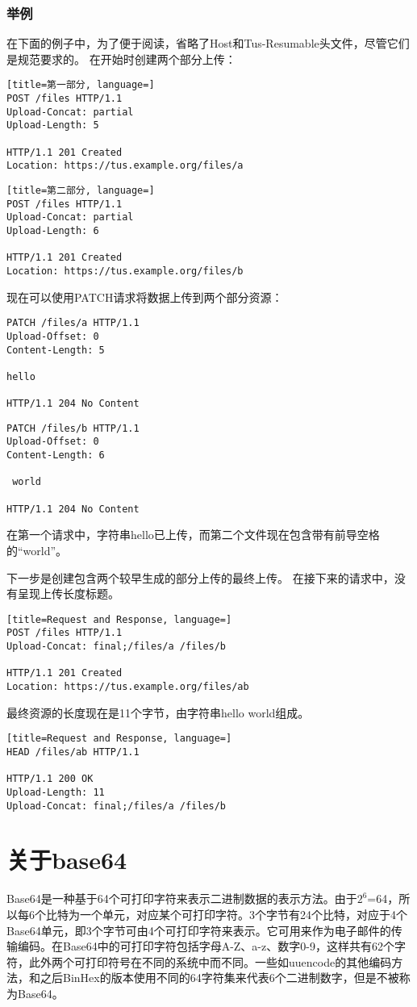 \documentclass[bachelor]{thesis-uestc}
\begin{document}
\subsubsection{举例}
在下面的例子中，为了便于阅读，省略了Host和Tus-Resumable头文件，尽管它们是规范要求的。 在开始时创建两个部分上传：
\begin{lstlisting}[title=第一部分, language=]
POST /files HTTP/1.1
Upload-Concat: partial
Upload-Length: 5

HTTP/1.1 201 Created
Location: https://tus.example.org/files/a
\end{lstlisting}
\begin{lstlisting}[title=第二部分, language=]
POST /files HTTP/1.1
Upload-Concat: partial
Upload-Length: 6

HTTP/1.1 201 Created
Location: https://tus.example.org/files/b
\end{lstlisting}
现在可以使用PATCH请求将数据上传到两个部分资源：
\begin{lstlisting}[title=第一部分]
PATCH /files/a HTTP/1.1
Upload-Offset: 0
Content-Length: 5

hello

HTTP/1.1 204 No Content
\end{lstlisting}
\begin{lstlisting}[title=第二部分]
PATCH /files/b HTTP/1.1
Upload-Offset: 0
Content-Length: 6

 world

HTTP/1.1 204 No Content
\end{lstlisting}
在第一个请求中，字符串hello已上传，而第二个文件现在包含带有前导空格的“world”。
\par 下一步是创建包含两个较早生成的部分上传的最终上传。 在接下来的请求中，没有呈现上传长度标题。
\begin{lstlisting}[title=Request and Response, language=]
POST /files HTTP/1.1
Upload-Concat: final;/files/a /files/b

HTTP/1.1 201 Created
Location: https://tus.example.org/files/ab
\end{lstlisting}
最终资源的长度现在是11个字节，由字符串hello world组成。
\begin{lstlisting}[title=Request and Response, language=]
HEAD /files/ab HTTP/1.1

HTTP/1.1 200 OK
Upload-Length: 11
Upload-Concat: final;/files/a /files/b
\end{lstlisting}

\section{关于base64}
Base64是一种基于64个可打印字符来表示二进制数据的表示方法。由于$2^{6}$=64，所以每6个比特为一个单元，对应某个可打印字符。3个字节有24个比特，对应于4个Base64单元，即3个字节可由4个可打印字符来表示。它可用来作为电子邮件的传输编码。在Base64中的可打印字符包括字母A-Z、a-z、数字0-9，这样共有62个字符，此外两个可打印符号在不同的系统中而不同。一些如uuencode的其他编码方法，和之后BinHex的版本使用不同的64字符集来代表6个二进制数字，但是不被称为Base64。
\end{document}
